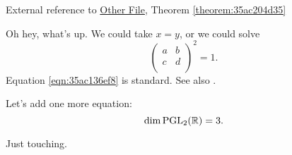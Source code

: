 \documentclass[reqno]{amsart} 
\numberwithin{equation}{section}
\begin{document}
External reference to \href{test2.pdf}{Other File}, Theorem \ref{theorem:35ac204d35}

Oh hey, what's up.  We could take $x = y$, or we could solve
\begin{equation}\label{eqn:35ac136ef8}
  \begin{pmatrix}
    a & b \\
    c & d \\
  \end{pmatrix}^2 = 1.
\end{equation}
Equation \eqref{eqn:35ac136ef8} is standard.  See also \cite{2021arXiv210915230N}.

Let's add one more equation:
\begin{equation*}
\dim \operatorname{PGL}_2(\mathbb{R}) = 3.
\end{equation*}

Just touching.



{} 
\end{document}
